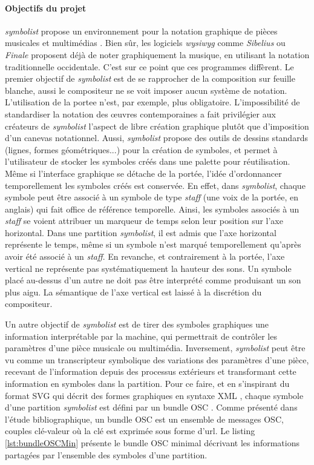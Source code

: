 \paragraph{Objectifs du projet} \textit{symbolist} propose un environnement pour la notation graphique de pièces musicales et multimédias \cite{gottfried2018}. Bien sûr, les logiciels \textit{wysiwyg} comme \textit{Sibelius} ou \textit{Finale} proposent déjà de noter graphiquement la musique, en utilisant la notation traditionnelle occidentale. C'est sur ce point que ces programmes diffèrent.
Le premier objectif de \textit{symbolist} est de se rapprocher de la composition sur feuille blanche, aussi le compositeur ne se voit imposer aucun système de notation. L'utilisation de la \gls{portee} n'est, par exemple, plus obligatoire.
L'impossibilité de standardiser la notation des œuvres contemporaines a fait privilégier aux créateurs de \textit{symbolist} l'aspect de libre création graphique plutôt que d'imposition d'un canevas notationnel.
Aussi, \textit{symbolist} propose des outils de dessins standards (lignes, formes géométriques...) pour la création de symboles, et permet à l'utilisateur de stocker les symboles créés dans une palette pour réutilisation.
Même si l'interface graphique se détache de la portée, l'idée d'ordonnancer temporellement les symboles créés est conservée. En effet, dans \textit{symbolist}, chaque symbole peut être associé à un symbole de type \textit{staff} (une voix de la portée, en anglais) qui fait office de référence temporelle. Ainsi, les symboles associés à un \textit{staff} se voient attribuer un marqueur de temps selon leur position sur l'axe horizontal. Dans une partition \textit{symbolist}, il est admis que l'axe horizontal représente le temps, même si un symbole n'est marqué temporellement qu'après avoir été associé à un \textit{staff}. En revanche, et contrairement à la portée, l'axe vertical ne représente pas systématiquement la hauteur des sons. Un symbole placé au-dessus d'un autre ne doit pas être interprété comme produisant un son plus aigu. La sémantique de l'axe vertical est laissé à la discrétion du compositeur.

Un autre objectif de \textit{symbolist} est de tirer des symboles graphiques une information interprétable par la machine, qui permettrait de contrôler les paramètres d'une pièce musicale ou multimédia. Inversement, \textit{symbolist} peut être vu comme un transcripteur symbolique des variations des paramètres d'une pièce, recevant de l'information depuis des processus extérieurs et transformant cette information en symboles dans la partition.   
Pour ce faire, et en s'inspirant du format SVG qui décrit des formes graphiques en syntaxe XML \cite{svg2011}, chaque symbole d'une partition \textit{symbolist} est défini par un bundle OSC \cite{wright2002}. Comme présenté dans l'étude bibliographique, un bundle OSC est un ensemble de messages OSC, couples clé-valeur où la clé est exprimée sous forme d'url.
Le listing \ref{lst:bundleOSCMin} présente le bundle OSC minimal décrivant les informations partagées par l'ensemble des symboles d'une partition.

